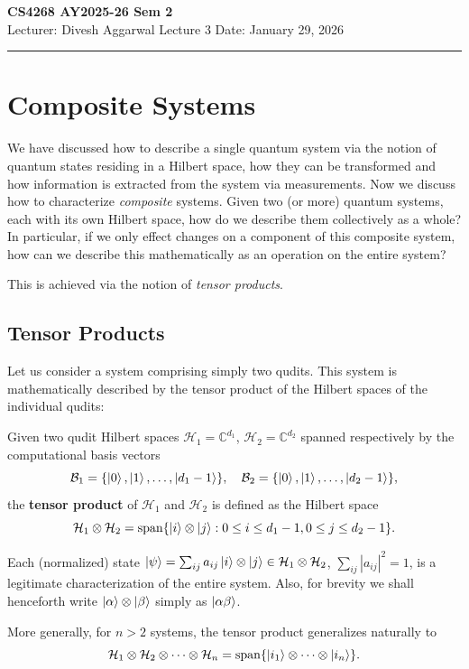 \noindent
\textbf{CS4268 AY2025-26 Sem 2}
\\
\noindent
Lecturer: Divesh Aggarwal
\hfill
Lecture 3                      %
\hfill
Date: January 29, 2026          %


\noindent
\rule{\textwidth}{1pt}

\medskip

\section{Composite Systems}
We have discussed how to describe a single quantum system via the notion of quantum states residing in a Hilbert space, how they can be transformed and how information is extracted from the system via measurements. Now we discuss how to characterize \textit{composite} systems. Given two (or more) quantum systems, each with its own Hilbert space, how do we describe them collectively as a whole? In particular, if we only effect changes on a component of this composite system, how can we describe this mathematically as an operation on the entire system? 

This is achieved via the notion of \textit{tensor products}.

\subsection{Tensor Products}
Let us consider a system comprising simply two qudits. This system is mathematically described by the tensor product of the Hilbert spaces of the individual qudits:

\begin{definition}\label{definition:tensor_products}
    Given two qudit Hilbert spaces $\mathcal{H}_1 = \mathbb{C}^{d_1}$, $\mathcal{H}_2 = \mathbb{C}^{d_2}$ spanned respectively by the computational basis vectors
    \[
    \mathcal{B}_1 = \{\ket{0}, \ket{1}, \dots, \ket{d_1-1}\}, \quad 
    \mathcal{B}_2 = \{\ket{0}, \ket{1}, \dots, \ket{d_2-1}\},
    \]
    the \textbf{tensor product} of $\mathcal{H}_1$ and $\mathcal{H}_2$ is defined as the Hilbert space
    \[
    \mathcal{H}_1 \otimes \mathcal{H}_2 = \text{span} \{\ket{i} \otimes \ket{j} : 0 \le i \le d_1-1, 0 \le j \le d_2-1 \}.
    \]

    Each (normalized) state $\ket{\psi} = \sum_{ij} {a_{ij}}\ket{i} \otimes \ket{j} \in \mathcal{H}_1 \otimes \mathcal{H}_2$, $\sum_{ij}|a_{ij}|^2=1$, is a legitimate characterization of the entire system. Also, for brevity we shall henceforth write $\ket{\alpha} \otimes \ket{\beta}$ simply as $\ket{\alpha\beta}$.

    More generally, for $n>2$ systems, the tensor product generalizes naturally to
    \[
    \mathcal{H}_1 \otimes \mathcal{H}_2 \otimes \dots \otimes \mathcal{H}_n = \text{span}\{\ket{i_1}\otimes \dots \otimes \ket{i_n}\}.
    \]
\end{definition}

